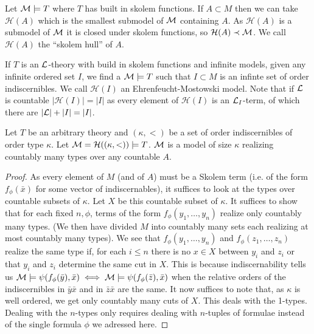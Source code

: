 \begin{definition}\label{definition_skolem_hull}
Let \(\mathcal{M} \models T\) where \(T\) has built in skolem functions. 
If \(A \subset M\) then we can take \(\mathcal{H}(A)\) which is the smallest submodel of \(\mathcal{M}\) containing \(A\).
As \(\mathcal{H}(A)\) is a submodel of \(\mathcal{M}\) it is closed under skolem functions, so \(\mathcal{H}(A) \prec \mathcal{M}\).
We call \(\mathcal{H}(A)\) the ``skolem hull'' of \(A\).
\end{definition}

\begin{definition}\label{definition_ehrenfeuct_mostowski_model}
If \(T\) is an \(\mathcal{L}\)-theory with build in skolem functions and infinite models, given any infinite ordered set \(I\), we find a \(\mathcal{M} \models T\) such that \(I \subset M\) is an infinte set of order indiscernibles. 
We call \(\mathcal{H}(I)\) an Ehrenfeucht-Mostowski model. 
Note that if \(\mathcal{L}\) is countable \(|\mathcal{H}(I)| = |I|\) as every element of \(\mathcal{H}(I)\) is an \(\mathcal{L}_{I}\)-term, of which there are \(|\mathcal{L}|+|I| = |I|\).
\end{definition}

\begin{theorem}\label{theorem_ehrenfeuct_mostowski_types}
Let \(T\) be an arbitrary theory and \((\kappa, <)\) be a set of order indiscernibles of order type \(\kappa\).
Let \(\mathcal{M} = \mathcal{H}((\kappa, <))\models T\). 
\(\mathcal{M}\) is a model of size \(\kappa\) realizing countably many types over any countable \(A\).
\end{theorem}

\begin{proof}
As every element of \(M\) (and of \(A\)) must be a Skolem term (i.e. of the form \(f_\phi(\bar{x})\) for some vector of indiscernables), it suffices to look at the types over countable subsets of \(\kappa\).
Let \(X\) be this countable subset of \(\kappa\). 
It suffices to show that for each fixed \(n, \phi\), terms of the form \(f_\phi(y_1, \ldots, y_n)\) realize only countably many types. 
(We then have divided \(M\) into countably many sets each realizing at most countably many types).
We see that \(f_\phi(y_1, \ldots, y_n)\) and \(f_\phi(z_1, \ldots, z_n)\) realize the same type if, for each \(i \leq n\) there is no \(x \in X\) between \(y_i\) and \(z_i\) or that \(y_i\) and \(z_i\) determine the same cut in \(X\).  
This is because indiscernability tells us \(\mathcal{M} \models \psi(f_\phi(\bar{y}), \bar{x}) \iff \mathcal{M} \models \psi(f_\phi(\bar{z}), \bar{x})\) when the relative orders of the indiscernibles in \(\bar{y}\bar{x}\) and in \(\bar{z}\bar{x}\) are the same. 
It now suffices to note that, as \(\kappa\) is well ordered, we get only countably many cuts of \(X\). 
This deals with the 1-types. Dealing with the \(n\)-types only requires dealing with \(n\)-tuples of formulae instead of the single formula \(\phi\) we adressed here. 
\end{proof}

